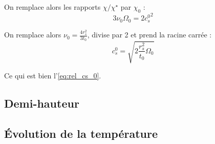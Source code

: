 On remplace alors les rapports $\chi/\chi^\star$ par $\chi_0$ :
\begin{equation}
    3 \nu_0 \Omega_0 = 2 {c_s^0}^2
\end{equation}

On remplace alors $\nu_0 = \frac{4 r_s^2}{3 t_0}$, divise par \num{2} et prend la racine carrée :
\begin{equation}
    c_s^0 = \sqrt{2 \frac{r_s^2}{t_0} \Omega_0}
\end{equation}

Ce qui est bien l’\cref{eq:rel_cs_0}.

\subsection{Demi-hauteur}

\subsection{Évolution de la température}


